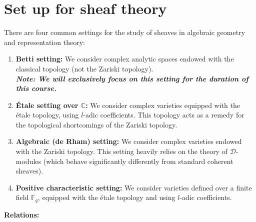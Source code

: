 
\section{Set up for sheaf theory}
There are four common settings for the study of sheaves in algebraic geometry and representation theory:

\begin{enumerate}
    \item \textbf{Betti setting:} We consider complex analytic spaces endowed with the classical topology (not the Zariski topology). \\
    \textit{\textbf{Note: We will exclusively focus on this setting for the duration of this course.}}
    
    \item \textbf{\'Etale setting over $\mathbb{C}$:} We consider complex varieties equipped with the \'etale topology, using $l$-adic coefficients. This topology acts as a remedy for the topological shortcomings of the Zariski topology.
    
    \item \textbf{Algebraic (de Rham) setting:} We consider complex varieties endowed with the Zariski topology. This setting heavily relies on the theory of $\mathcal{D}$-modules (which behave significantly differently from standard coherent sheaves).
    
    \item \textbf{Positive characteristic setting:} We consider varieties defined over a finite field $\mathbb{F}_q$, equipped with the \'etale topology and using $l$-adic coefficients.
\end{enumerate}

\textbf{Relations:}
\begin{center}
\end{center}

